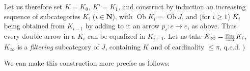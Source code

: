 \documentclass[11pt]{article}
\newcommand{\Ob}{\operatorname{Ob}}
\newcommand{\limind}{\varinjlim}
\begin{document}
Let us therefore set $K = K_0$, $K' = K_1$, and construct by induction an increasing sequence of subcategories $K_i$ ($i \in \mathbf{N}$), with $\Ob K_i = \Ob J$, and (for $i \geqslant 1$) $K_i$ being obtained from $K_{i-1}$ by adding to it an arrow $p_i : e \longrightarrow e$, as above. Thus every double arrow in a $K_i$ can be equalized in $K_{i+1}$. Let us take $K_\infty = \limind K_i$, $K_\infty$ is a \textit{filtering} subcategory of $J$, containing $K$ and of cardinality $\leqslant \pi$, q.e.d. $\Biggr)$

We can make this construction more precise as follows:
\end{document}
